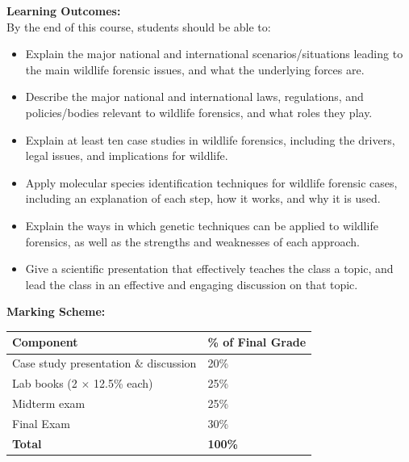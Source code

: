 \documentclass[hidelinks]{article}
\begin{document}
	
	\textbf{Learning Outcomes:}\\
	By the end of this course, students should be able to:
		\begin{itemize}[topsep=-8pt]
			\item Explain the major national and international scenarios/situations leading to the main wildlife forensic issues, and what the underlying forces are.
			\item Describe the major national and international laws, regulations, and policies/bodies relevant to wildlife forensics, and what roles they play.
			\item Explain at least ten case studies in wildlife forensics, including the drivers, legal issues, and implications for wildlife.
			\item Apply molecular species identification techniques for wildlife forensic cases, including an explanation of each step, how it works, and why it is used.
			\item Explain the ways in which genetic techniques can be applied to wildlife forensics, as well as the strengths and weaknesses of each approach.
			\item Give a scientific presentation that effectively teaches the class a topic, and lead the class in an effective and engaging discussion on that topic.\\
		\end{itemize}

	
	\vspace{0.3cm}
	\textbf{Marking Scheme:}
		\begin{table}[H]
		\centering
			\begin{tabular}{l l}
				\toprule
				\textbf{Component} & \textbf{\% of Final Grade}\\
				\midrule
				Case study presentation \& discussion & 20\%\\
				\addlinespace
				Lab books (2 $\times$ 12.5\% each) & 25\%\\
				\addlinespace
				Midterm exam & 25\%\\
				\addlinespace
				Final Exam & 30\%\\
				\midrule
				\textbf{Total} & \textbf{100\%}\\
				\bottomrule
			\end{tabular}
		\end{table}	
\end{document}
